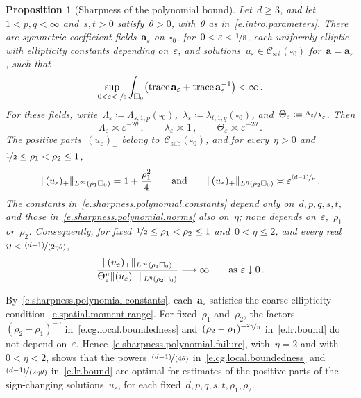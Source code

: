 \documentclass[11pt,letterpaper]{article}
\numberwithin{equation}{section}
\newtheorem{proposition}[theorem]{Proposition}
\theoremstyle{definition}
\renewcommand{\a}{\mathbf{a}}
\newcommand{\eps}{\varepsilon}
\newcommand{\nf}{\nicefrac}
\newcommand{\cu}{\square}
\newcommand*{\tr}{\mathrm{trace\,}}
\DeclarePairedDelimiter{\norm}{\lVert}{\rVert}
\newcommand{\Csol}{\mathcal C_{\mathrm{sol}}}
\newcommand{\Csub}{\mathcal C_{\mathrm{sub}}}
\begin{document}
\begin{proposition}[Sharpness of the polynomial bound]
\label{p.sharpness.polynomial}
Let~$d\geq3$, and let~$1<p,q<\infty$ and~$s,t>0$ satisfy~$\theta>0$, with~$\theta$ as in~\eqref{e.intro.parameters}. There are symmetric coefficient fields~$\a_\eps$ on~$\cu_0$, for~$0<\eps<\nf18$, each uniformly elliptic with ellipticity constants depending on~$\eps$, and solutions~$u_\eps\in\Csol(\cu_0)$ for~$\a=\a_\eps$, such that
\begin{equation}
	\sup_{0<\eps<\nf18}\int_{\cu_0}\bigl(\tr\a_\eps+\tr\a_\eps^{-1}\bigr)<\infty\,.
	\label{e.sharpness.polynomial.traces}
\end{equation}
For these fields, write~$\Lambda_\eps\coloneqq\Lambda_{s,1,p}(\cu_0)$,~$\lambda_\eps\coloneqq\lambda_{t,1,q}(\cu_0)$, and~$\Theta_\eps\coloneqq\nf{\Lambda_\eps}{\lambda_\eps}$. Then
\begin{equation}
	\Lambda_\eps\asymp\eps^{-2\theta}\,,\qquad\lambda_\eps\asymp1\,,\qquad\Theta_\eps\asymp\eps^{-2\theta}\,.
	\label{e.sharpness.polynomial.constants}
\end{equation}
The positive parts~$(u_\eps)_+$ belong to~$\Csub(\cu_0)$, and for every~$\eta>0$ and~$\nf12\leq\rho_1<\rho_2\leq1$,
\begin{equation}
	\norm{(u_\eps)_+}_{L^\infty(\rho_1\cu_0)}=1+\frac{\rho_1^2}4\qquad\mbox{and}\qquad\norm{(u_\eps)_+}_{L^\eta(\rho_2\cu_0)}\asymp\eps^{\nf{(d-1)}\eta}\,.
	\label{e.sharpness.polynomial.norms}
\end{equation}
The constants in~\eqref{e.sharpness.polynomial.constants} depend only on~$d,p,q,s,t$, and those in~\eqref{e.sharpness.polynomial.norms} also on~$\eta$; none depends on~$\eps$,~$\rho_1$ or~$\rho_2$. Consequently, for fixed~$\nf12\leq\rho_1<\rho_2\leq1$ and~$0<\eta\leq2$, and every real~$\upsilon<\nf{(d-1)}{(2\eta\theta)}$,
\begin{equation}
	\frac{\norm{(u_\eps)_+}_{L^\infty(\rho_1\cu_0)}}{\Theta_\eps^\upsilon\norm{(u_\eps)_+}_{L^\eta(\rho_2\cu_0)}}\longrightarrow\infty\qquad\mbox{as }\eps\downarrow0\,.
	\label{e.sharpness.polynomial.failure}
\end{equation}
\end{proposition}

\smallskip
By~\eqref{e.sharpness.polynomial.constants}, each~$\a_\eps$ satisfies the coarse ellipticity condition~\eqref{e.spatial.moment.range}. For fixed~$\rho_1$ and~$\rho_2$, the factors~$(\rho_2-\rho_1)^{-\gamma}$ in~\eqref{e.cg.local.boundedness} and~$(\rho_2-\rho_1)^{-\nf{2\gamma}\eta}$ in~\eqref{e.lr.bound} do not depend on~$\eps$. Hence~\eqref{e.sharpness.polynomial.failure}, with~$\eta=2$ and with~$0<\eta<2$, shows that the powers~$\nf{(d-1)}{(4\theta)}$ in~\eqref{e.cg.local.boundedness} and~$\nf{(d-1)}{(2\eta\theta)}$ in~\eqref{e.lr.bound} are optimal for estimates of the positive parts of the sign-changing solutions~$u_\eps$, for each fixed~$d,p,q,s,t,\rho_1,\rho_2$.
\end{document}

